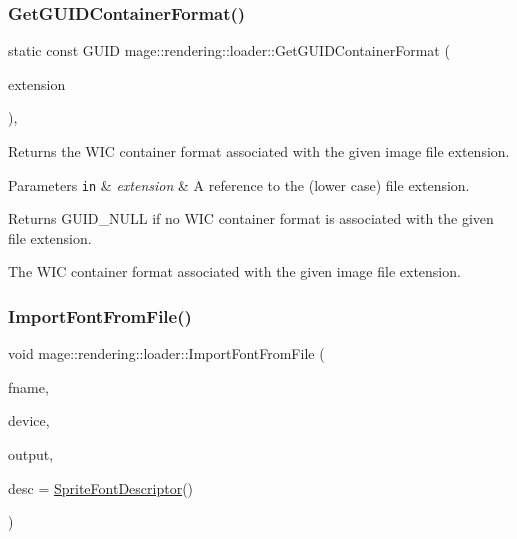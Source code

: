 \subsubsection{\texorpdfstring{Get\+G\+U\+I\+D\+Container\+Format()}{GetGUIDContainerFormat()}}
{\footnotesize\ttfamily static const G\+U\+ID mage\+::rendering\+::loader\+::\+Get\+G\+U\+I\+D\+Container\+Format (\begin{DoxyParamCaption}\item[{const wstring \&}]{extension }\end{DoxyParamCaption})\hspace{0.3cm}{\ttfamily [static]}, {\ttfamily [noexcept]}}

Returns the W\+IC container format associated with the given image file extension.


\begin{DoxyParams}[1]{Parameters}
\mbox{\tt in}  & {\em extension} & A reference to the (lower case) file extension. \\
\hline
\end{DoxyParams}
\begin{DoxyReturn}{Returns}
{\ttfamily G\+U\+I\+D\+\_\+\+N\+U\+LL} if no W\+IC container format is associated with the given file extension. 

The W\+IC container format associated with the given image file extension. 
\end{DoxyReturn}
\hypertarget{namespacemage_1_1rendering_1_1loader_a86772125cef425229a1adb3bc3a613f0}{}\label{namespacemage_1_1rendering_1_1loader_a86772125cef425229a1adb3bc3a613f0} 
\subsubsection{\texorpdfstring{Import\+Font\+From\+File()}{ImportFontFromFile()}}
{\footnotesize\ttfamily void mage\+::rendering\+::loader\+::\+Import\+Font\+From\+File (\begin{DoxyParamCaption}\item[{const wstring \&}]{fname,  }\item[{I\+D3\+D11\+Device \&}]{device,  }\item[{\hyperlink{structmage_1_1rendering_1_1_sprite_font_output}{Sprite\+Font\+Output} \&}]{output,  }\item[{const \hyperlink{classmage_1_1rendering_1_1_sprite_font_descriptor}{Sprite\+Font\+Descriptor} \&}]{desc = {\ttfamily \hyperlink{classmage_1_1rendering_1_1_sprite_font_descriptor}{Sprite\+Font\+Descriptor}()} }\end{DoxyParamCaption})}

